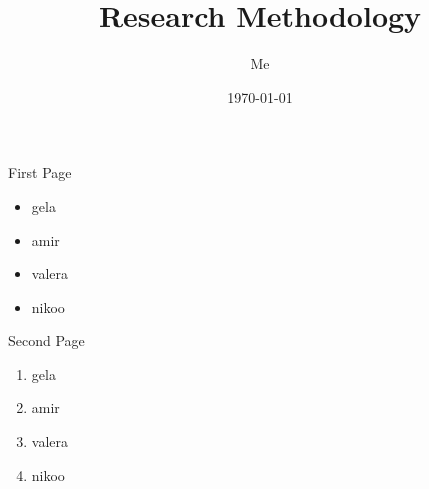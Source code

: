 \documentclass{beamer}
\begin{document}
\title{Research Methodology}

\author{Me}

\date{\today}
	
\maketitle

\begin{frame}{First Page}
	\begin{itemize}
		\item gela
		\item amir
		\item valera
		\item nikoo
	\end{itemize} 
\end{frame}

\begin{frame}{Second Page}
	\begin{enumerate}
		\item gela
		\item amir
		\item valera
		\item nikoo
	\end{enumerate}
\end{frame}
\end{document}
